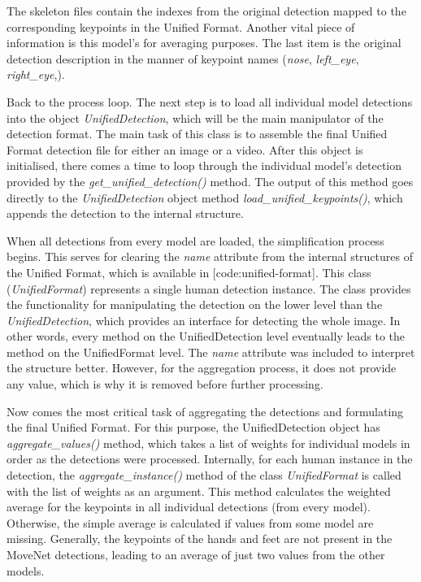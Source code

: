 The skeleton files contain the indexes from the original detection mapped to the corresponding keypoints in the Unified Format. Another vital piece of information is this model's  for averaging purposes. The last item is the original detection description in the manner of keypoint names ({\it nose}, {\it left_eye}, {\it right_eye},\edots).


Back to the process loop. The next step is to load all individual model detections into the object {\it UnifiedDetection}, which will be the main manipulator of the detection format. The main task of this class is to assemble the final Unified Format detection file for either an image or a video. After this object is initialised, there comes a time to loop through the individual model's detection provided by the {\it get_unified_detection()} method. The output of this method goes directly to the {\it UnifiedDetection} object method {\it load_unified_keypoints()}, which appends the detection to the internal structure.

When all detections from every model are loaded, the simplification process begins. This serves for clearing the {\it name} attribute from the internal structures of the Unified Format, which is available in [code:unified-format]. This class ({\it UnifiedFormat}) represents a single human detection instance. The class provides the functionality for manipulating the detection on the lower level than the {\it UnifiedDetection}, which provides an interface for detecting the whole image. In other words, every method on the UnifiedDetection level eventually leads to the method on the UnifiedFormat level. The {\it name} attribute was included to interpret the structure better. However, for the aggregation process, it does not provide any value, which is why it is removed before further processing.


Now comes the most critical task of aggregating the detections and formulating the final Unified Format. For this purpose, the UnifiedDetection object has {\it aggregate_values()} method, which takes a list of weights for individual models in order as the detections were processed. Internally, for each human instance in the detection, the {\it aggregate_instance()} method of the class {\it UnifiedFormat} is called with the list of weights as an argument. This method calculates the weighted average for the keypoints in all individual detections (from every model). Otherwise, the simple average is calculated if values from some model are missing. Generally, the keypoints of the hands and feet are not present in the MoveNet detections, leading to an average of just two values from the other models.

